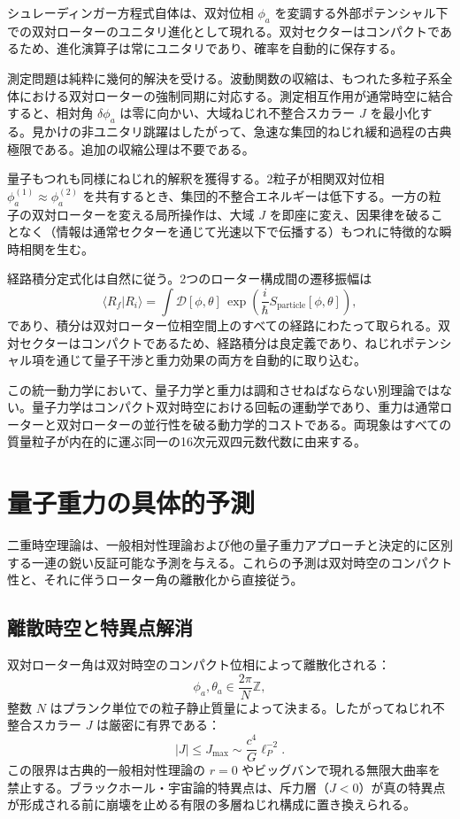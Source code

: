 \documentclass[a4paper]{article}
\begin{document}
シュレーディンガー方程式自体は、双対位相 $\phi_a$ を変調する外部ポテンシャル下での双対ローターのユニタリ進化として現れる。双対セクターはコンパクトであるため、進化演算子は常にユニタリであり、確率を自動的に保存する。

測定問題は純粋に幾何的解決を受ける。波動関数の収縮は、もつれた多粒子系全体における双対ローターの強制同期に対応する。測定相互作用が通常時空に結合すると、相対角 $\delta\phi_a$ は零に向かい、大域ねじれ不整合スカラー $J$ を最小化する。見かけの非ユニタリ跳躍はしたがって、急速な集団的ねじれ緩和過程の古典極限である。追加の収縮公理は不要である。

量子もつれも同様にねじれ的解釈を獲得する。2粒子が相関双対位相 $\phi_a^{(1)} \approx \phi_a^{(2)}$ を共有するとき、集団的不整合エネルギーは低下する。一方の粒子の双対ローターを変える局所操作は、大域 $J$ を即座に変え、因果律を破ることなく（情報は通常セクターを通じて光速以下で伝播する）もつれに特徴的な瞬時相関を生む。

経路積分定式化は自然に従う。2つのローター構成間の遷移振幅は
\[
\langle R_f | R_i \rangle = \int \mathcal{D}[\phi,\theta] \, \exp\left( \frac{i}{\hbar} S_\text{particle}[\phi,\theta] \right),
\]
であり、積分は双対ローター位相空間上のすべての経路にわたって取られる。双対セクターはコンパクトであるため、経路積分は良定義であり、ねじれポテンシャル項を通じて量子干渉と重力効果の両方を自動的に取り込む。

この統一動力学において、量子力学と重力は調和させねばならない別理論ではない。量子力学はコンパクト双対時空における回転の運動学であり、重力は通常ローターと双対ローターの並行性を破る動力学的コストである。両現象はすべての質量粒子が内在的に運ぶ同一の16次元双四元数代数に由来する。

\section{量子重力の具体的予測}
\label{sec:predictions}

二重時空理論は、一般相対性理論および他の量子重力アプローチと決定的に区別する一連の鋭い反証可能な予測を与える。これらの予測は双対時空のコンパクト性と、それに伴うローター角の離散化から直接従う。

\subsection{離散時空と特異点解消}

双対ローター角は双対時空のコンパクト位相によって離散化される：
\[
\phi_a, \theta_a \in \frac{2\pi}{N}\mathbb{Z},
\]
整数 $N$ はプランク単位での粒子静止質量によって決まる。したがってねじれ不整合スカラー $J$ は厳密に有界である：
\[
|J| \leq J_\text{max} \sim \frac{c^4}{G} \ell_P^{-2}.
\]
この限界は古典的一般相対性理論の $r=0$ やビッグバンで現れる無限大曲率を禁止する。ブラックホール・宇宙論的特異点は、斥力層（$J < 0$）が真の特異点が形成される前に崩壊を止める有限の多層ねじれ構成に置き換えられる。
\end{document}
